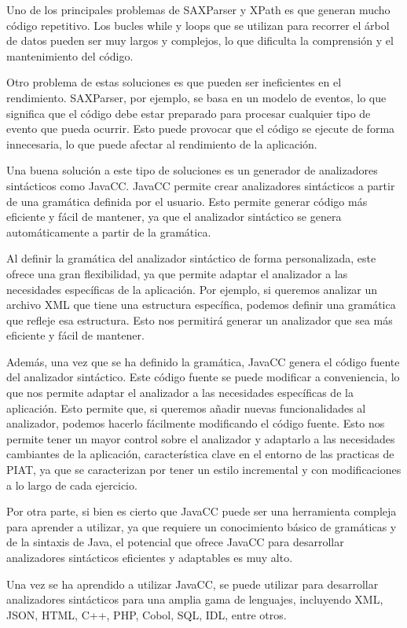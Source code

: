 Uno de los principales problemas de SAXParser y XPath es que generan mucho código repetitivo. Los bucles while y loops que se utilizan para recorrer el árbol de datos pueden ser muy largos y complejos, lo que dificulta la comprensión y el mantenimiento del código.

Otro problema de estas soluciones es que pueden ser ineficientes en el rendimiento. SAXParser, por ejemplo, se basa en un modelo de eventos, lo que significa que el código debe estar preparado para procesar cualquier tipo de evento que pueda ocurrir. Esto puede provocar que el código se ejecute de forma innecesaria, lo que puede afectar al rendimiento de la aplicación.

Una buena solución a este tipo de soluciones es un generador de analizadores sintácticos como JavaCC. JavaCC permite crear analizadores sintácticos a partir de una gramática definida por el usuario. Esto permite generar código más eficiente y fácil de mantener, ya que el analizador sintáctico se genera automáticamente a partir de la gramática.

Al definir la gramática del analizador sintáctico de forma personalizada, este ofrece una gran flexibilidad, ya que permite adaptar el analizador a las necesidades específicas de la aplicación. Por ejemplo, si queremos analizar un archivo XML que tiene una estructura específica, podemos definir una gramática que refleje esa estructura. Esto nos permitirá generar un analizador que sea más eficiente y fácil de mantener.

Además, una vez que se ha definido la gramática, JavaCC genera el código fuente del analizador sintáctico. Este código fuente se puede modificar a conveniencia, lo que nos permite adaptar el analizador a las necesidades específicas de la aplicación. Esto permite que, si queremos añadir nuevas funcionalidades al analizador, podemos hacerlo fácilmente modificando el código fuente. Esto nos permite tener un mayor control sobre el analizador y adaptarlo a las necesidades cambiantes de la aplicación, característica clave en el entorno de las practicas de PIAT, ya que se caracterizan por tener un estilo incremental y con modificaciones a lo largo de cada ejercicio.

Por otra parte, si bien es cierto que JavaCC puede ser una herramienta compleja para aprender a utilizar, ya que requiere un conocimiento básico de gramáticas y de la sintaxis de Java, el potencial que ofrece JavaCC para desarrollar analizadores sintácticos eficientes y adaptables es muy alto.

Una vez se ha aprendido a utilizar JavaCC, se puede utilizar para desarrollar analizadores sintácticos para una amplia gama de lenguajes, incluyendo XML, JSON, HTML, C++, PHP, Cobol, SQL, IDL, entre otros\cite{javaccgithub}.